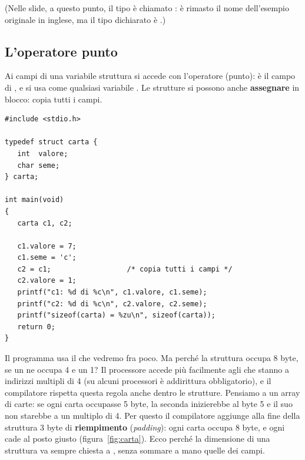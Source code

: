 (Nelle slide, a questo punto, il tipo è chiamato : è
rimasto il nome dell'esempio originale in inglese, ma il tipo dichiarato è
.)

\subsection{L'operatore punto}

Ai campi di una variabile struttura si accede con l'operatore 
(punto):  è il campo  di , e si usa
come qualsiasi variabile . Le strutture si possono anche
\textbf{assegnare} in blocco:  copia tutti i campi.

\begin{affianco}[0.5][c]
\begin{lstlisting}[style=c, name=carta.c]
#include <stdio.h>

typedef struct carta {
   int  valore;
   char seme;
} carta;

int main(void)
{
   carta c1, c2;

   c1.valore = 7;
   c1.seme = 'c';
   c2 = c1;                  /* copia tutti i campi */
   c2.valore = 1;
   printf("c1: %d di %c\n", c1.valore, c1.seme);
   printf("c2: %d di %c\n", c2.valore, c2.seme);
   printf("sizeof(carta) = %zu\n", sizeof(carta));
   return 0;
}
\end{lstlisting}
\risultato
{}
\end{affianco}

Il programma usa il  che vedremo fra poco. Ma perché la
struttura occupa 8 byte, se un  ne occupa 4 e un  1? Il
processore accede più facilmente agli  che stanno a indirizzi
multipli di 4 (su alcuni processori è addirittura obbligatorio), e il
compilatore rispetta questa regola anche dentro le strutture. Pensiamo a un
array di carte: se ogni carta occupasse 5 byte, la seconda inizierebbe al
byte 5 e il suo  non starebbe a un multiplo di 4. Per questo il
compilatore aggiunge alla fine della struttura 3 byte di
\textbf{riempimento} (\textit{padding}): ogni carta occupa 8 byte, e ogni
 cade al posto giusto (figura~\ref{fig:carta}). Ecco perché la
dimensione di una struttura va sempre chiesta a , senza sommare
a mano quelle dei campi.

